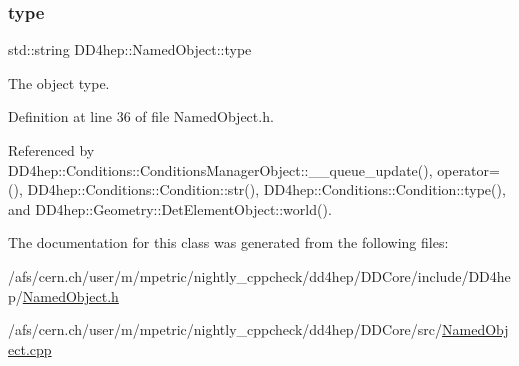\hypertarget{class_d_d4hep_1_1_named_object_a8e17bb5f854b320302be44c68c39a192}{}\label{class_d_d4hep_1_1_named_object_a8e17bb5f854b320302be44c68c39a192} 
\subsubsection{\texorpdfstring{type}{type}}
{\footnotesize\ttfamily std\+::string D\+D4hep\+::\+Named\+Object\+::type}



The object type. 



Definition at line 36 of file Named\+Object.\+h.



Referenced by D\+D4hep\+::\+Conditions\+::\+Conditions\+Manager\+Object\+::\+\_\+\+\_\+queue\+\_\+update(), operator=(), D\+D4hep\+::\+Conditions\+::\+Condition\+::str(), D\+D4hep\+::\+Conditions\+::\+Condition\+::type(), and D\+D4hep\+::\+Geometry\+::\+Det\+Element\+Object\+::world().



The documentation for this class was generated from the following files\+:\begin{DoxyCompactItemize}
\item 
/afs/cern.\+ch/user/m/mpetric/nightly\+\_\+cppcheck/dd4hep/\+D\+D\+Core/include/\+D\+D4hep/\hyperlink{_named_object_8h}{Named\+Object.\+h}\item 
/afs/cern.\+ch/user/m/mpetric/nightly\+\_\+cppcheck/dd4hep/\+D\+D\+Core/src/\hyperlink{_named_object_8cpp}{Named\+Object.\+cpp}\end{DoxyCompactItemize}
